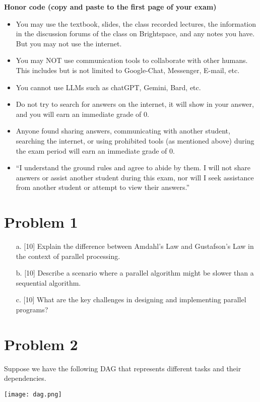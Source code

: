 \documentclass{article}
\begin{document}
\textbf{Honor code (copy and paste to the first page of your exam)}
\begin{itemize}
    \item You may use the textbook, slides, the class recorded lectures, the information in the discussion forums of the class on Brightspace, and any notes you have. But you may not use the internet.
    \item You may NOT use communication tools to collaborate with other humans. This includes but is not limited to Google-Chat, Messenger, E-mail, etc.
    \item You cannot use LLMs such as chatGPT, Gemini, Bard, etc.
    \item Do not try to search for answers on the internet, it will show in your answer, and you will earn an immediate grade of 0.
    \item Anyone found sharing answers, communicating with another student, searching the internet, or using prohibited tools (as mentioned above) during the exam period will earn an immediate grade of 0.
    \item “I understand the ground rules and agree to abide by them. I will not share answers or assist another student during this exam, nor will I seek assistance from another student or attempt to view their answers.”
\end{itemize}

\section*{Problem 1}
\begin{enumerate}
    \item[a.] [10]  Explain the difference between Amdahl's Law and Gustafson's Law in the context of parallel processing.
    \item[b.] [10] Describe a scenario where a parallel algorithm might be slower than a sequential algorithm.
    \item[c.] [10] What are the key challenges in designing and implementing parallel programs?
\end{enumerate}

\section*{Problem 2}
Suppose we have the following DAG that represents different tasks and their dependencies.

\begin{center}
\texttt{[image: dag.png]} %
\end{center}
\end{document}

